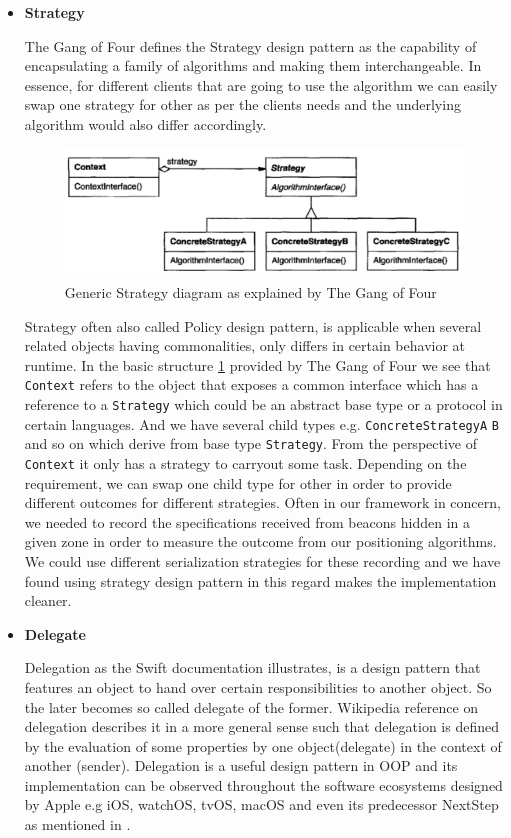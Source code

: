 \begin{itemize}
	\item \textbf{Strategy}
	\par The Gang of Four \cite{gamma1995design} defines the Strategy design pattern as the capability of encapsulating  a family of algorithms and making them interchangeable. In essence, for different clients that are going to use the algorithm we can easily swap one strategy for other as per the clients needs and the underlying algorithm would also differ accordingly.
	\begin{figure}[H]
		\centering
		\includegraphics[scale = 0.5]{images/strategy}
		\caption{Generic Strategy diagram as explained by The Gang of Four  \cite{gamma1995design}}
		\label{figure:design_pattern_strategy}
	\end{figure}
	\par Strategy often also called Policy design pattern, is applicable when several related objects having commonalities, only differs in certain behavior at runtime. In the basic structure \ref{figure:design_pattern_strategy} provided by The Gang of Four \cite{gamma1995design} we see that \texttt{Context} refers to the object that exposes a common interface which has a reference to a \texttt{Strategy} which could be an abstract base type or a protocol in certain languages. And we have several child types e.g. \texttt{ConcreteStrategyA} \texttt{B} and so on which derive from base type \texttt{Strategy}. From the perspective of \texttt{Context} it only has a strategy to carryout some task. Depending on the requirement, we can swap one child type for other in order to provide different outcomes for different strategies. Often in our framework in concern, we needed to record the specifications received from beacons hidden in a given zone in order to measure the outcome from our positioning algorithms. We could use different serialization strategies for these recording and we have found using strategy design pattern in this regard makes the implementation cleaner.
	\item \textbf{Delegate}
	\par Delegation as the Swift documentation \cite{swiftdelegation} illustrates, is a design pattern that features an object to hand over certain responsibilities to another object. So the later becomes so called delegate of the former. Wikipedia reference \cite{wikidelegation} on delegation describes it in a more general sense such that delegation is defined by the evaluation of some properties by one object(delegate) in the context of another (sender). Delegation is a useful design pattern in OOP and its implementation can be observed throughout the software ecosystems designed by Apple e.g iOS, watchOS, tvOS, macOS and even its predecessor NextStep as mentioned in \cite{wikidelegation}.

\end{itemize}
